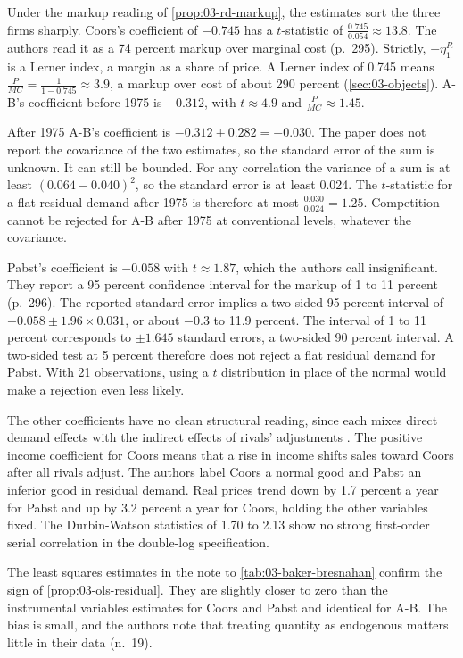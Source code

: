 Under the markup reading of \cref{prop:03-rd-markup}, the estimates sort the three firms sharply. Coors's
coefficient of $-0.745$ has a $t$-statistic of $\frac{0.745}{0.054} \approx 13.8$. The authors read it as a
74 percent markup over marginal cost (p.~295). Strictly, $-\eta^R_1$ is a Lerner index, a margin as a share
of price. A Lerner index of 0.745 means $\frac{P}{MC} = \frac{1}{1 - 0.745} \approx 3.9$, a markup over cost
of about 290 percent (\cref{sec:03-objects}). A-B's coefficient before 1975 is $-0.312$, with $t \approx 4.9$
and $\frac{P}{MC} \approx 1.45$.

After 1975 A-B's coefficient is $-0.312 + 0.282 = -0.030$. The paper does not report the covariance of the
two estimates, so the standard error of the sum is unknown. It can still be bounded. For any correlation the
variance of a sum is at least $(0.064 - 0.040)^2$, so the standard error is at least 0.024. The
$t$-statistic for a flat residual demand after 1975 is therefore at most $\frac{0.030}{0.024} = 1.25$.
Competition cannot be rejected for A-B after 1975 at conventional levels, whatever the covariance.

Pabst's coefficient is $-0.058$ with $t \approx 1.87$, which the authors call insignificant. They report a 95
percent confidence interval for the markup of 1 to 11 percent (p.~296). The reported standard error implies
a two-sided 95 percent interval of $-0.058 \pm 1.96 \times 0.031$, or about $-0.3$ to 11.9 percent. The
interval of 1 to 11 percent corresponds to $\pm 1.645$ standard errors, a two-sided 90 percent interval. A
two-sided test at 5 percent therefore does not reject a flat residual demand for Pabst. With 21 observations,
using a $t$ distribution in place of the normal would make a rejection even less likely.

The other coefficients have no clean structural reading, since each mixes direct demand effects with the
indirect effects of rivals' adjustments \citep[p.~297]{BakerBresnahan1988}. The positive income coefficient
for Coors means that a rise in income shifts sales toward Coors after all rivals adjust. The authors label
Coors a normal good and Pabst an inferior good in residual demand. Real prices trend down by 1.7 percent a
year for Pabst and up by 3.2 percent a year for Coors, holding the other variables fixed. The Durbin-Watson
statistics of 1.70 to 2.13 show no strong first-order serial correlation in the double-log specification.

The least squares estimates in the note to \cref{tab:03-baker-bresnahan} confirm the sign of
\cref{prop:03-ols-residual}. They are slightly closer to zero than the instrumental variables estimates for
Coors and Pabst and identical for A-B. The bias is small, and the authors note that treating quantity as
endogenous matters little in their data (n.~19).


